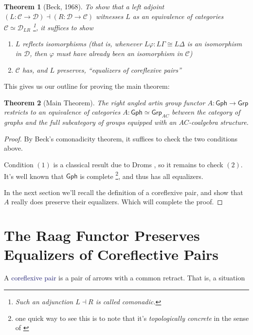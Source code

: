 \documentclass[12pt]{article}
\newtheorem*{thm*}{Theorem}
\theoremstyle{definition}
\theoremstyle{theorem}
\newcommand*{\catFont}[1]{\mathsf{#1}}
\newcommand*{\catVarFont}[1]{\mathcal{#1}}
\newcommand{\Grp}{\catFont{Grp}}
\newcommand{\catC}{\catVarFont{C}}
\newcommand{\catD}{\catVarFont{D}}
\newcommand*{\important}[1]{\textcolor{MidnightBlue}{#1}}
\newcommand{\Gph}{\mathsf{Gph}}
\begin{document}
\begin{thm*}[Beck, 1968]
  To show that a left adjoint
  $(L : \catC \to \catD) \dashv (R : \catD \to \catC)$ 
  witnesses $L$ as an equivalence of categories $\catC \simeq \catD_{LR}$%
  \footnote{Such an adjunction $L \dashv R$ is called \emph{comonadic}.},
  it suffices to show

  \begin{enumerate}
      \item $L$ reflects isomorphisms (that is, whenever 
        $L \varphi : L\Gamma \cong L\Delta$ is an isomorphism in $\catD$, 
        then $\varphi$ must have already been an isomorphism in $\catC$)
      \item $\catC$ has, and $L$ preserves, ``equalizers of coreflexive pairs''
  \end{enumerate}
\end{thm*}

This gives us our outline for proving the main theorem:

\begin{thm*}[Main Theorem]
  The right angled artin group functor $A : \Gph \to \Grp$ restricts to 
  an equivalence of categories $A : \Gph \simeq \Grp_{AC}$ between the 
  category of graphs and the full subcategory of groups equipped with an 
  $AC$-coalgebra structure.
\end{thm*}

\begin{proof}
  By Beck's comonadicity theorem, it suffices to check the two conditions 
  above.

  Condition $(1)$ is a classical result due to Droms 
  \cite{dromsIsomorphismsGraphGroups1987}, 
  so it remains to check $(2)$. It's well known that $\mathsf{Gph}$
  is complete%
  \footnote{one quick way to see this is to note that it's \emph{topologically concrete}
  in the sense of \cite{adamekAbstractConcreteCategories2009}}, and thus has all equalizers. 

  In the next section we'll recall the definition of a coreflexive pair, 
  and show that $A$ really does preserve their equalizers. Which will 
  complete the proof.
\end{proof}

\section{The Raag Functor Preserves Equalizers of Coreflective Pairs}
\label{proof}

A \important{coreflexive pair} is a pair of arrows with a common retract. 
That is, a situation
\end{document}
